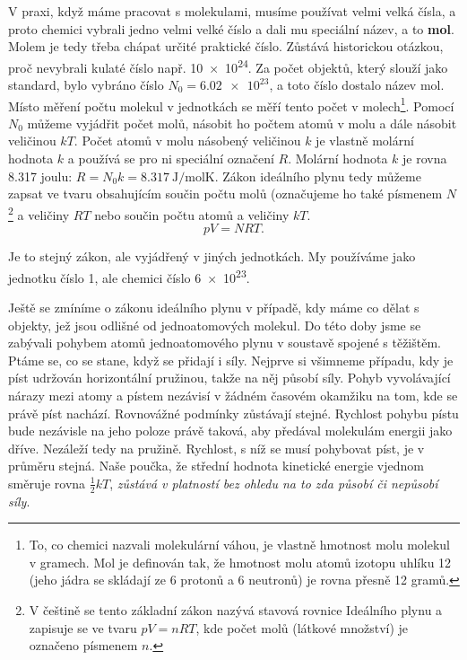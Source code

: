     V praxi, když máme pracovat s molekulami, musíme používat velmi velká čísla, a proto chemici
    vybrali jedno velmi velké číslo a dali mu speciální název, a to \textbf{mol}. Molem je tedy
    třeba chápat určité praktické číslo. Zůstává historickou otázkou, proč nevybrali kulaté číslo
    např. \num{10e24}. Za počet objektů, který slouží jako standard, bylo vybráno číslo \(N_0 =
    \num{6.02e23}\), a toto číslo dostalo název mol. Místo měření počtu molekul v jednotkách se měří
    tento počet v molech\footnote{To, co chemici nazvali molekulární váhou, je vlastně hmotnost molu
    molekul v gramech. Mol je definován tak, že hmotnost molu atomů izotopu uhlíku 12 (jeho jádra se
    skládají ze 6 protonů a 6 neutronů) je rovna přesně \num{12} gramů.}.  Pomocí \(N_0\) můžeme
    vyjádřit počet molů, násobit ho počtem atomů v molu a dále násobit veličinou \(kT\). Počet atomů
    v molu násobený veličinou \(k\) je vlastně molární hodnota \(k\) a používá se pro ni speciální
    označení \(R\). Molární hodnota \(k\) je rovna \num{8.317} joulu: \(R = N_0k =
    \SI{8.317}{\joule\per\mol\kelvin}\). Zákon ideálního plynu tedy můžeme zapsat ve tvaru
    obsahujícím součin počtu molů (označujeme ho také písmenem \(N\)\footnote{ V češtině se tento
    základní zákon nazývá stavová rovnice Ideálního plynu a zapisuje se ve tvaru \(pV=nRT\), kde
    počet molů (látkové množství) je označeno písmenem \(n\).} a veličiny \(RT\) nebo součin počtu
    atomů a veličiny \(kT\).
    \begin{equation}\label{fyz:eq633}
      \boxed{pV=NRT}.
    \end{equation}

    Je to stejný zákon, ale vyjádřený v jiných jednotkách. My používáme jako jednotku číslo \num{1},
    ale chemici číslo \num{6e23}.

    Ještě se zmíníme o zákonu ideálního plynu v případě, kdy máme co dělat s objekty, jež jsou
    odlišné od jednoatomových molekul. Do této doby jsme se zabývali pohybem atomů jednoatomového
    plynu v soustavě spojené s těžištěm. Ptáme se, co se stane, když se přidají i síly. Nejprve si
    všimneme případu, kdy je píst udržován horizontální pružinou, takže na něj působí síly. Pohyb
    vyvolávající nárazy mezi atomy a pístem nezávisí v žádném časovém okamžiku na tom, kde se právě
    píst nachází. Rovnovážné podmínky zůstávají stejné. Rychlost pohybu pístu bude nezávisle na jeho
    poloze právě taková, aby předával molekulám energii jako dříve. Nezáleží tedy na pružině.
    Rychlost, s níž se musí pohybovat píst, je v průměru stejná. Naše poučka, že střední hodnota
    kinetické energie vjednom směruje rovna \(\frac{1}{2}kT\), \emph{zůstává v platností bez ohledu na to
    zda působí či nepůsobí síly}.

